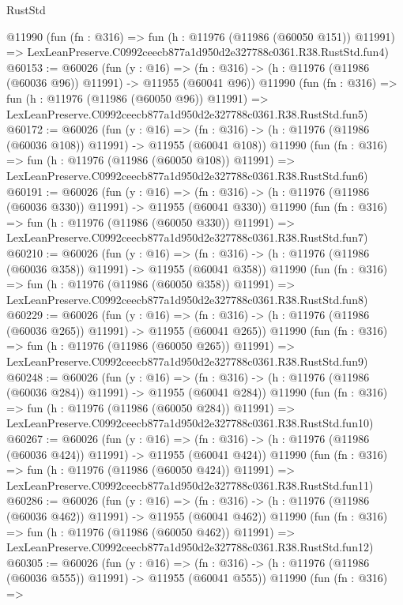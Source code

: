 \begin{lexlean}{RustStd}
\begin{coremodule}
    @11990
    (fun (fn : @316) =>
    fun (h : @11976 (@11986 (@60050 @151)) @11991) =>
    LexLeanPreserve.C0992ceecb877a1d950d2e327788c0361.R38.RustStd.fun4)
@60153 := @60026
    (fun (y : @16) =>
    (fn : @316) -> (h : @11976 (@11986 (@60036 @96)) @11991) -> @11955 (@60041 @96))
    @11990
    (fun (fn : @316) =>
    fun (h : @11976 (@11986 (@60050 @96)) @11991) =>
    LexLeanPreserve.C0992ceecb877a1d950d2e327788c0361.R38.RustStd.fun5)
@60172 := @60026
    (fun (y : @16) =>
    (fn : @316) -> (h : @11976 (@11986 (@60036 @108)) @11991) -> @11955 (@60041 @108))
    @11990
    (fun (fn : @316) =>
    fun (h : @11976 (@11986 (@60050 @108)) @11991) =>
    LexLeanPreserve.C0992ceecb877a1d950d2e327788c0361.R38.RustStd.fun6)
@60191 := @60026
    (fun (y : @16) =>
    (fn : @316) -> (h : @11976 (@11986 (@60036 @330)) @11991) -> @11955 (@60041 @330))
    @11990
    (fun (fn : @316) =>
    fun (h : @11976 (@11986 (@60050 @330)) @11991) =>
    LexLeanPreserve.C0992ceecb877a1d950d2e327788c0361.R38.RustStd.fun7)
@60210 := @60026
    (fun (y : @16) =>
    (fn : @316) -> (h : @11976 (@11986 (@60036 @358)) @11991) -> @11955 (@60041 @358))
    @11990
    (fun (fn : @316) =>
    fun (h : @11976 (@11986 (@60050 @358)) @11991) =>
    LexLeanPreserve.C0992ceecb877a1d950d2e327788c0361.R38.RustStd.fun8)
@60229 := @60026
    (fun (y : @16) =>
    (fn : @316) -> (h : @11976 (@11986 (@60036 @265)) @11991) -> @11955 (@60041 @265))
    @11990
    (fun (fn : @316) =>
    fun (h : @11976 (@11986 (@60050 @265)) @11991) =>
    LexLeanPreserve.C0992ceecb877a1d950d2e327788c0361.R38.RustStd.fun9)
@60248 := @60026
    (fun (y : @16) =>
    (fn : @316) -> (h : @11976 (@11986 (@60036 @284)) @11991) -> @11955 (@60041 @284))
    @11990
    (fun (fn : @316) =>
    fun (h : @11976 (@11986 (@60050 @284)) @11991) =>
    LexLeanPreserve.C0992ceecb877a1d950d2e327788c0361.R38.RustStd.fun10)
@60267 := @60026
    (fun (y : @16) =>
    (fn : @316) -> (h : @11976 (@11986 (@60036 @424)) @11991) -> @11955 (@60041 @424))
    @11990
    (fun (fn : @316) =>
    fun (h : @11976 (@11986 (@60050 @424)) @11991) =>
    LexLeanPreserve.C0992ceecb877a1d950d2e327788c0361.R38.RustStd.fun11)
@60286 := @60026
    (fun (y : @16) =>
    (fn : @316) -> (h : @11976 (@11986 (@60036 @462)) @11991) -> @11955 (@60041 @462))
    @11990
    (fun (fn : @316) =>
    fun (h : @11976 (@11986 (@60050 @462)) @11991) =>
    LexLeanPreserve.C0992ceecb877a1d950d2e327788c0361.R38.RustStd.fun12)
@60305 := @60026
    (fun (y : @16) =>
    (fn : @316) -> (h : @11976 (@11986 (@60036 @555)) @11991) -> @11955 (@60041 @555))
    @11990
    (fun (fn : @316) =>

\end{coremodule}
\end{lexlean}
